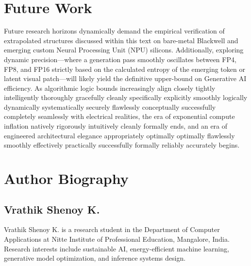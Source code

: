\documentclass[12pt, a4paper]{report}
\begin{document}
\section{Future Work}
Future research horizons dynamically demand the empirical verification of extrapolated structures discussed within this text on bare-metal Blackwell and emerging custom Neural Processing Unit (NPU) silicons. Additionally, exploring dynamic precision—where a generation pass smoothly oscillates between FP4, FP8, and FP16 strictly based on the calculated entropy of the emerging token or latent visual patch—will likely yield the definitive upper-bound on Generative AI efficiency. As algorithmic logic bounds increasingly align closely tightly intelligently thoroughly gracefully cleanly specifically explicitly smoothly logically dynamically systematically securely flawlessly conceptually successfully completely seamlessly with electrical realities, the era of exponential compute inflation natively rigorously intuitively cleanly formally ends, and an era of engineered architectural elegance appropriately optimally optimally flawlessly smoothly effectively practically successfully formally reliably accurately begins.

\clearpage



\clearpage
\section*{Author Biography}

\subsection*{Vrathik Shenoy K.}
Vrathik Shenoy K. is a research student in the Department of Computer Applications at Nitte Institute of Professional Education, Mangalore, India. Research interests include sustainable AI, energy-efficient machine learning, generative model optimization, and inference systems design.
\end{document}

